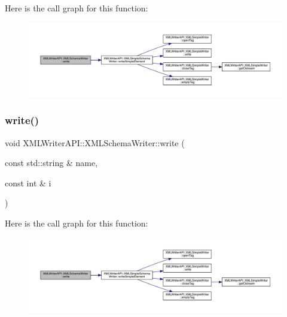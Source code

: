 Here is the call graph for this function\+:
\nopagebreak
\begin{figure}[H]
\begin{center}
\leavevmode
\includegraphics[width=350pt]{db/d34/classXMLWriterAPI_1_1XMLSchemaWriter_a1b951af62e2106b76e33022c0f1b5d88_cgraph}
\end{center}
\end{figure}
\mbox{\label{classXMLWriterAPI_1_1XMLSchemaWriter_a1b951af62e2106b76e33022c0f1b5d88}} 
\subsubsection{\texorpdfstring{write()}{write()}\hspace{0.1cm}{\footnotesize\ttfamily [4/10]}}
{\footnotesize\ttfamily void X\+M\+L\+Writer\+A\+P\+I\+::\+X\+M\+L\+Schema\+Writer\+::write (\begin{DoxyParamCaption}\item[{const std\+::string \&}]{name,  }\item[{const int \&}]{i }\end{DoxyParamCaption})\hspace{0.3cm}{\ttfamily [inline]}}

Here is the call graph for this function\+:
\nopagebreak
\begin{figure}[H]
\begin{center}
\leavevmode
\includegraphics[width=350pt]{db/d34/classXMLWriterAPI_1_1XMLSchemaWriter_a1b951af62e2106b76e33022c0f1b5d88_cgraph}
\end{center}
\end{figure}
\mbox{\label{classXMLWriterAPI_1_1XMLSchemaWriter_affbcfbac63240a8048b6b0940cc05c30}} 
